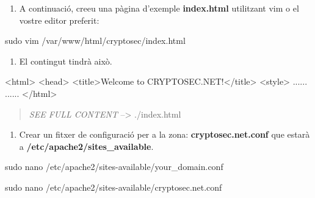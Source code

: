 \documentclass[]{article}
\newenvironment{Shaded}{}{}
\newcommand{\ExtensionTok}[1]{#1}
\newcommand{\FunctionTok}[1]{\textcolor[rgb]{0.02,0.16,0.49}{#1}}
\newcommand{\NormalTok}[1]{#1}
\newcommand{\OperatorTok}[1]{\textcolor[rgb]{0.40,0.40,0.40}{#1}}
\providecommand{\tightlist}{%
  \setlength{\itemsep}{0pt}\setlength{\parskip}{0pt}}
\begin{document}
\begin{enumerate}
\def\labelenumi{\arabic{enumi}.}
\setcounter{enumi}{3}
\tightlist
\item
  A continuació, creeu una pàgina d'exemple \textbf{index.html}
  utilitzant vim o el vostre editor preferit:
\end{enumerate}

\begin{Shaded}
\begin{Highlighting}[]
\FunctionTok{sudo}\NormalTok{ vim /var/www/html/cryptosec/index.html}
\end{Highlighting}
\end{Shaded}

\begin{enumerate}
\def\labelenumi{\arabic{enumi}.}
\setcounter{enumi}{4}
\tightlist
\item
  El contingut tindrà això.
\end{enumerate}

\begin{Shaded}
\begin{Highlighting}[]
\OperatorTok{<}\ExtensionTok{html}\OperatorTok{>}
    \OperatorTok{<}\FunctionTok{head}\OperatorTok{>}
        \OperatorTok{<}\ExtensionTok{title}\OperatorTok{>}\NormalTok{Welcome to CRYPTOSEC.NET!}\OperatorTok{<}\NormalTok{/title}\OperatorTok{>}
    \OperatorTok{<}\ExtensionTok{style}\OperatorTok{>}
\ExtensionTok{......}
\ExtensionTok{......}
\OperatorTok{<}\NormalTok{/}\ExtensionTok{html}\OperatorTok{>}
\end{Highlighting}
\end{Shaded}

\begin{quote}
\emph{SEE FULL CONTENT} --\textgreater{} ./index.html
\end{quote}

\begin{enumerate}
\def\labelenumi{\arabic{enumi}.}
\setcounter{enumi}{5}
\tightlist
\item
  Crear un fitxer de configuració per a la zona:
  \textbf{cryptosec.net.conf} que estarà a
  \textbf{/etc/apache2/sites\_available}.
\end{enumerate}

sudo nano /etc/apache2/sites-available/your\_domain.conf

\begin{Shaded}
\begin{Highlighting}[]
\FunctionTok{sudo}\NormalTok{ nano /etc/apache2/sites-available/cryptosec.net.conf}
\end{Highlighting}
\end{Shaded}
\end{document}
